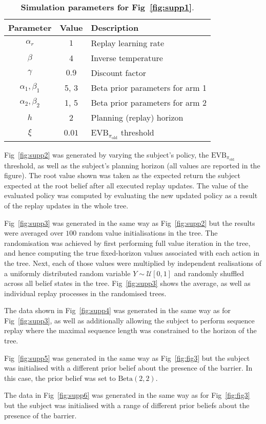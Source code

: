 \begin{table}[h!]
    \centering
    \begin{tabular}{c|c|l}
         Parameter & Value & Description \\ \hline
         $\alpha_r$ & $1$ & Replay learning rate \\
         $\beta$ & 4 & Inverse temperature \\
         $\gamma$ & $0.9$ & Discount factor \\
         $\alpha_1, \beta_1$ & 5, 3 & Beta prior parameters for arm 1 \\
         $\alpha_2, \beta_2$ & 1, 5 & Beta prior parameters for arm 2 \\
         $h$ & 2 & Planning (replay) horizon \\
         $\xi$ & $0.01$ & $\text{EVB}_{\pi_{\text{old}}}$ threshold \\
    \end{tabular}
    \caption{\textbf{Simulation parameters for Fig~\ref{fig:supp1}}.}
    \label{tbl:tbl5}
\end{table}

Fig~\ref{fig:supp2} was generated by varying the subject's policy, the $\text{EVB}_{\pi_{\text{old}}}$ threshold, as well as the subject's planning horizon (all values are reported in the figure). The root value shown was taken as the expected return the subject expected at the root belief after all executed replay updates. The value of the evaluated policy was computed by evaluating the new updated policy as a result of the replay updates in the whole tree.

Fig~\ref{fig:supp3} was generated in the same way as Fig~\ref{fig:supp2} but the results were averaged over $100$ random value initialisations in the tree. The randomisation was achieved by first performing full value iteration in the tree, and hence computing the true fixed-horizon values associated with each action in the tree. Next, each of those values were multiplied by independent realisations of a uniformly distributed random variable $Y \sim \mathcal{U}[0, 1]$ and randomly shuffled across all belief states in the tree. Fig~\ref{fig:supp3} shows the average, as well as individual replay processes in the randomised trees. 

The data shown in Fig~\ref{fig:supp4} was generated in the same way as for Fig~\ref{fig:supp3}, as well as additionally allowing the subject to perform sequence replay where the maximal sequence length was constrained to the horizon of the tree. 

Fig~\ref{fig:supp5} was generated in the same way as Fig~\ref{fig:fig3} but the subject was initialised with a different prior belief about the presence of the barrier. In this case, the prior belief was set to $\text{Beta}(2, 2)$.

The data in Fig~\ref{fig:supp6} was generated in the same way as for Fig~\ref{fig:fig3} but the subject was initialised with a range of different prior beliefs about the presence of the barrier. 